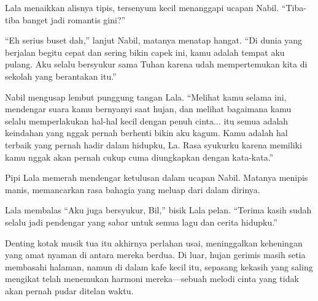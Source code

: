 Lala menaikkan alisnya tipis, tersenyum kecil menanggapi ucapan Nabil. ``Tiba-tiba banget jadi romantis gini?''

``Eh serius buset dah,'' lanjut Nabil, matanya menatap hangat. ``Di dunia yang berjalan begitu cepat dan sering bikin capek ini, kamu adalah tempat aku pulang. Aku selalu bersyukur sama Tuhan karena udah mempertemukan kita di sekolah yang berantakan itu.''

Nabil mengusap lembut punggung tangan Lala. ``Melihat kamu selama ini, mendengar suara kamu bernyanyi saat hujan, dan melihat bagaimana kamu selalu memperlakukan hal-hal kecil dengan penuh cinta$\dots$ itu semua adalah keindahan yang nggak pernah berhenti bikin aku kagum. Kamu adalah hal terbaik yang pernah hadir dalam hidupku, La. Rasa syukurku karena memiliki kamu nggak akan pernah cukup cuma diungkapkan dengan kata-kata.''

Pipi Lala memerah mendengar ketulusan dalam ucapan Nabil. Matanya menipis manis, memancarkan rasa bahagia yang meluap dari dalam dirinya.

Lala membalas ``Aku juga bersyukur, Bil,'' bisik Lala pelan. ``Terima kasih sudah selalu jadi pendengar yang sabar untuk semua lagu dan cerita hidupku.''

Denting kotak musik tua itu akhirnya perlahan usai, meninggalkan keheningan yang amat nyaman di antara mereka berdua. Di luar, hujan gerimis masih setia membasahi halaman, namun di dalam kafe kecil itu, sepasang kekasih yang saling mengikat telah menemukan harmoni mereka—sebuah melodi cinta yang tidak akan pernah pudar ditelan waktu.

\jedahias
